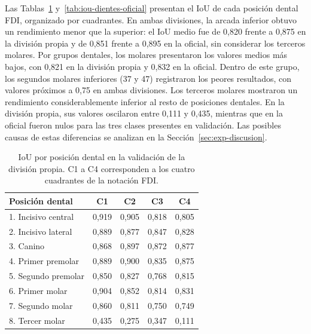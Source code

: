 Las Tablas~\ref{tab:iou-dientes-propio} y~\ref{tab:iou-dientes-oficial} presentan el IoU de cada posición dental FDI, organizado por cuadrantes. En ambas divisiones, la arcada inferior obtuvo un rendimiento menor que la superior: el IoU medio fue de 0{,}820 frente a 0{,}875 en la división propia y de 0{,}851 frente a 0{,}895 en la oficial, sin considerar los terceros molares. Por grupos dentales, los molares presentaron los valores medios más bajos, con 0{,}821 en la división propia y 0{,}832 en la oficial. Dentro de este grupo, los segundos molares inferiores (37 y 47) registraron los peores resultados, con valores próximos a 0{,}75 en ambas divisiones. Los terceros molares mostraron un rendimiento considerablemente inferior al resto de posiciones dentales. En la división propia, sus valores oscilaron entre 0{,}111 y 0{,}435, mientras que en la oficial fueron nulos para las tres clases presentes en validación. Las posibles causas de estas diferencias se analizan en la Sección~\ref{sec:exp-discusion}.

\begin{table}[htbp]
    \centering
    \small
    \begin{tabular}{lcccc}
         \hline
         \textbf{Posición dental} & \textbf{C1} & \textbf{C2} & \textbf{C3} & \textbf{C4} \\
         \hline
         1. Incisivo central & 0{,}919 & 0{,}905 & 0{,}818 & 0{,}805 \\
         2. Incisivo lateral & 0{,}889 & 0{,}877 & 0{,}847 & 0{,}828 \\
         3. Canino & 0{,}868 & 0{,}897 & 0{,}872 & 0{,}877 \\
         4. Primer premolar & 0{,}889 & 0{,}900 & 0{,}835 & 0{,}875 \\
         5. Segundo premolar & 0{,}850 & 0{,}827 & 0{,}768 & 0{,}815 \\
         6. Primer molar & 0{,}904 & 0{,}852 & 0{,}814 & 0{,}831 \\
         7. Segundo molar & 0{,}860 & 0{,}811 & 0{,}750 & 0{,}749 \\
         8. Tercer molar & 0{,}435 & 0{,}275 & 0{,}347 & 0{,}111 \\
         \hline
    \end{tabular}
    \caption{IoU por posición dental en la validación de la división propia. C1 a C4 corresponden a los cuatro cuadrantes de la notación FDI.}
    \label{tab:iou-dientes-propio}
\end{table}

